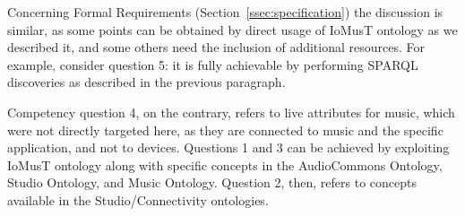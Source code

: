 Concerning Formal Requirements (Section~\ref{ssec:specification}) the discussion is similar, as some points can be obtained by direct usage of IoMusT ontology as we described it, and some others need the inclusion of additional resources. For example, consider question 5: it is fully achievable by performing SPARQL discoveries as described in the previous paragraph. 

Competency question 4, on the contrary, refers to live attributes for music, which were not directly targeted here, as they are connected to music and the specific application, and not to devices. Questions 1 and 3 can be achieved by exploiting IoMusT ontology along with specific concepts in the AudioCommons Ontology, Studio Ontology, and Music Ontology. Question 2, then, refers to concepts available in the Studio/Connectivity ontologies.

